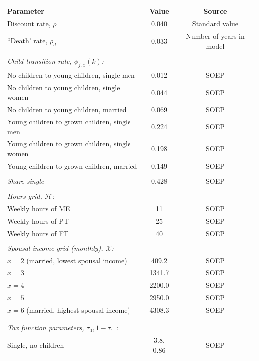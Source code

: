  \begin{tabular}{lcc} \hline \hline
  Parameter  &     Value & Source  \\ 
  \hline  
Discount rate, $\rho$ &        0.040 & Standard value \\
``Death' rate, $\rho_d$ &        0.033 & Number of years in model \\
 & \\  
\multicolumn{3}{l}{\textit{Child transition rate, $\phi_{j,x}(k)$:}} \\
No children to young children, single men &        0.012 & SOEP \\
No children to young children, single women &        0.044  & SOEP \\
No children to young children, married &        0.069  & SOEP \\
Young children to grown children, single men &        0.224  & SOEP  \\
Young children to grown children, single women &        0.198 & SOEP \\
Young children to grown children, married &        0.149 & SOEP \\
 & \\  
\textit{Share single} &        0.428  & SOEP  \\
 & \\  
\multicolumn{3}{l}{\textit{Hours grid, $\mathcal{H}$:}} \\
Weekly hours of ME &           11 & SOEP \\
Weekly hours of PT &           25  & SOEP  \\
Weekly hours of FT &           40  & SOEP  \\
 & \\  
\multicolumn{3}{l}{\textit{Spousal income grid (monthly), $\mathcal{X}$:}}  \\
$x=2$ (married, lowest spousal income) &        409.2  & SOEP \\
$x=3$ &       1341.7 & SOEP \\
$x=4$ &       2200.0 & SOEP \\
$x=5$ &       2950.0 & SOEP  \\
$x=6$ (married, highest spousal income) &       4308.3 & SOEP \\
 & \\  
 & \\  
\multicolumn{3}{l}{\textit{Tax function parameters, $\tau_0,1-\tau_1$ :}}  \\
Single, no children  &          3.8,         0.86  & SOEP \\

\end{tabular}

